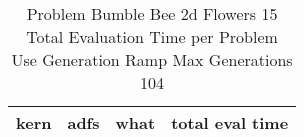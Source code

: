 \begin{table}[H]
\caption{Problem  Bumble Bee 2d  Flowers 15\\Total Evaluation Time per Problem \\ Use Generation Ramp  Max Generations 104\\}
\begin{center}
\scalebox{1.0} %
{
\begin{tabular}{lllr}
\hline
kern & adfs & what & total eval time \\
\hline


\end{tabular}
}
\end{center}
\end{table}

